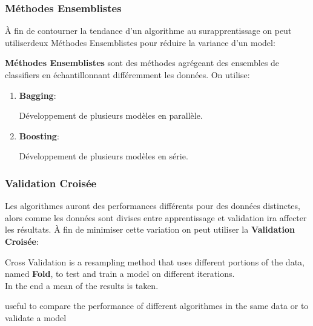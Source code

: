 \documentclass{article}
\begin{document}
\subsubsection{Méthodes Ensemblistes}
À fin de contourner la tendance d'un algorithme au surapprentissage on peut utiliserdeux Méthodes Ensemblistes pour réduire la variance d'un model:
\begin{definition}
    \textbf{Méthodes Ensemblistes} sont des méthodes agrégeant des ensembles de classifiers en échantillonnant différemment les données. On utilise:
    \begin{enumerate}[noitemsep, rightmargin = \leftmargin]
        \item \textbf{Bagging}:
        \begin{definition}
            Développement de plusieurs modèles en parallèle.
        \end{definition}
        \item \textbf{Boosting}:
        \begin{definition}
            Développement de plusieurs modèles en série.
        \end{definition}
    \end{enumerate} 
\end{definition}  

\subsubsection{Validation Croisée}
Les algorithmes auront des performances différents pour des données distinctes, alors comme les données sont divises entre apprentissage et validation ira affecter les résultats. À fin de minimiser cette variation on peut utiliser la \textbf{Validation Croisée}:
\begin{definition}
    Cross Validation is a resampling method that uses different portions of the data, named \textbf{Fold}, to test and train a model on different iterations.\\
    
    In the end a mean of the results is taken.
    \begin{phrase}
        useful to compare the performance of different algorithmes in the same data or to validate a model
    \end{phrase}
\end{definition}
\end{document}
